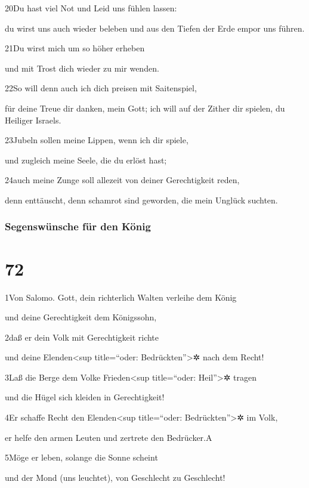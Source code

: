 20Du hast viel Not und Leid uns fühlen lassen:

du wirst uns auch wieder beleben und aus den Tiefen der Erde empor uns
führen.

21Du wirst mich um so höher erheben

und mit Trost dich wieder zu mir wenden.

22So will denn auch ich dich preisen mit Saitenspiel,

für deine Treue dir danken, mein Gott; ich will auf der Zither dir
spielen, du Heiliger Israels.

23Jubeln sollen meine Lippen, wenn ich dir spiele,

und zugleich meine Seele, die du erlöst hast;

24auch meine Zunge soll allezeit von deiner Gerechtigkeit reden,

denn enttäuscht, denn schamrot sind geworden, die mein Unglück suchten.

\hypertarget{segenswuxfcnsche-fuxfcr-den-kuxf6nig}{%
\subsubsection{Segenswünsche für den
König}\label{segenswuxfcnsche-fuxfcr-den-kuxf6nig}}

\hypertarget{section-71}{%
\section{72}\label{section-71}}

1Von Salomo. Gott, dein richterlich Walten verleihe dem König

und deine Gerechtigkeit dem Königssohn,

2daß er dein Volk mit Gerechtigkeit richte

und deine Elenden\textless sup title=``oder: Bedrückten''\textgreater✲
nach dem Recht!

3Laß die Berge dem Volke Frieden\textless sup title=``oder:
Heil''\textgreater✲ tragen

und die Hügel sich kleiden in Gerechtigkeit!

4Er schaffe Recht den Elenden\textless sup title=``oder:
Bedrückten''\textgreater✲ im Volk,

er helfe den armen Leuten und zertrete den Bedrücker.{A}

5Möge er leben, solange die Sonne scheint

und der Mond (uns leuchtet), von Geschlecht zu Geschlecht!

